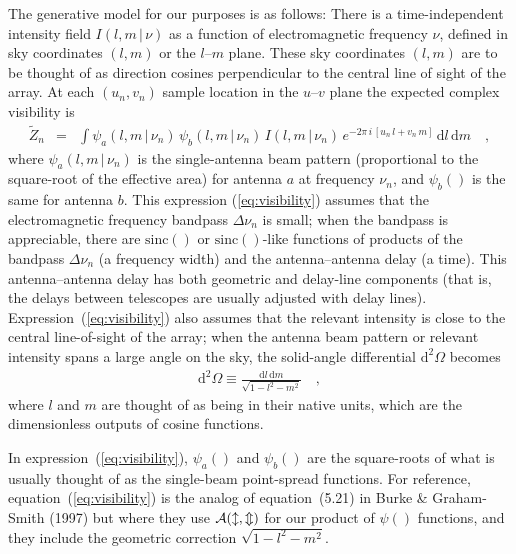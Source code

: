 \documentclass[12pt]{article}
\renewcommand{\exp}[1]{e^{#1}}
\newcommand{\sinc}{\mathrm{sinc}}
\newcommand{\given}{\,|\,}
\newcommand{\expectation}[1]{\tilde{#1}}
\newcommand{\dd}{\mathrm{d}}
\begin{document}
The generative model for our purposes is as follows: There is a
time-independent intensity field $I(l,m\given\nu)$ as a function of
electromagnetic frequency $\nu$, defined in sky coordinates $(l,m)$ or
the $l$--$m$ plane.  These sky coordinates $(l, m)$ are to be thought
of as direction cosines perpendicular to the central line of sight of
the array.  At each $(u_n, v_n)$ sample location in the $u$--$v$ plane
the expected complex visibility is
\begin{eqnarray}
\label{eq:visibility}
\expectation{Z}_n &=& \int \psi_a(l,m\given\nu_n)\,\psi_b(l,m\given\nu_n)\,I(l,m\given\nu_n)
                         \,\exp{-2\pi\,i\,[u_n\,l + v_n\,m]}\,\dd l\,\dd m
\quad ,
\end{eqnarray}
where $\psi_a(l,m\given\nu_n)$ is the single-antenna beam pattern
(proportional to the square-root of the effective area) for antenna
$a$ at frequency $\nu_n$, and $\psi_b()$ is the same for antenna $b$.
This expression (\ref{eq:visibility}) assumes that the electromagnetic
frequency bandpass $\Delta\nu_n$ is small; when the bandpass is
appreciable, there are $\sinc()$ or $\sinc()$-like functions of
products of the bandpass $\Delta\nu_n$ (a frequency width) and the
antenna--antenna delay (a time).  This antenna--antenna delay has both
geometric and delay-line components (that is, the delays between
telescopes are usually adjusted with delay lines).
Expression~(\ref{eq:visibility}) also assumes that the relevant
intensity is close to the central line-of-sight of the array; when the
antenna beam pattern or relevant intensity spans a large angle on the
sky, the solid-angle differential $\dd^2\Omega$ becomes
\begin{eqnarray}
\dd^2\Omega \equiv \frac{\dd l\,\dd m}{\sqrt{1-l^2-m^2}}
\quad ,
\end{eqnarray}
where $l$ and $m$ are thought of as being in their native units, which
are the dimensionless outputs of cosine functions.

In expression~(\ref{eq:visibility}), $\psi_a()$ and $\psi_b()$ are the
square-roots of what is usually thought of as the single-beam
point-spread functions.  For reference, equation~(\ref{eq:visibility})
is the analog of equation~(5.21) in Burke \& Graham-Smith (1997) but
where they use $\cal{A}(l,m)$ for our product of $\psi()$ functions,
and they include the geometric correction $\sqrt{1-l^2-m^2}$.
\end{document}
